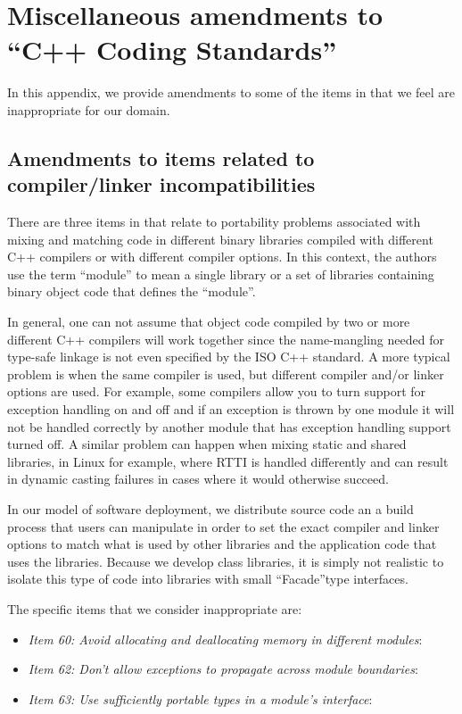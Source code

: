 %
\section{Miscellaneous amendments to ``C++ Coding Standards''}
\label{sec:misc_amendments}
%

In this appendix, we provide amendments to some of the items in
{}\cite{C++CodingStandards05} that we feel are inappropriate for our domain.

%
\subsection{Amendments to items related to compiler/linker incompatibilities}
%

There are three items in {}\cite{C++CodingStandards05} that relate to
portability problems associated with mixing and matching code in different
binary libraries compiled with different C++ compilers or with different
compiler options.  In this context, the authors use the term ``module'' to
mean a single library or a set of libraries containing binary object code that
defines the ``module''.

In general, one can not assume that object code compiled by two or more
different C++ compilers will work together since the name-mangling needed for
type-safe linkage is not even specified by the ISO C++ standard.  A more
typical problem is when the same compiler is used, but different compiler
and/or linker options are used.  For example, some compilers allow you to turn
support for exception handling on and off and if an exception is thrown by one
module it will not be handled correctly by another module that has exception
handling support turned off.  A similar problem can happen when mixing static
and shared libraries, in Linux for example, where RTTI is handled differently
and can result in dynamic casting failures in cases where it would otherwise
succeed.

In our model of software deployment, we distribute source code an a build
process that users can manipulate in order to set the exact compiler and
linker options to match what is used by other libraries and the application
code that uses the libraries.  Because we develop class libraries, it is
simply not realistic to isolate this type of code into libraries with small
``Facade''type interfaces.

The specific items that we consider inappropriate are:

\begin{itemize}

{}\item\textit{Item 60: Avoid allocating and deallocating memory in different
modules}:

{}\item\textit{Item 62: Don't allow exceptions to propagate across module
boundaries}:

{}\item\textit{Item 63: Use sufficiently portable types in a module's
interface}:

\end{itemize}

